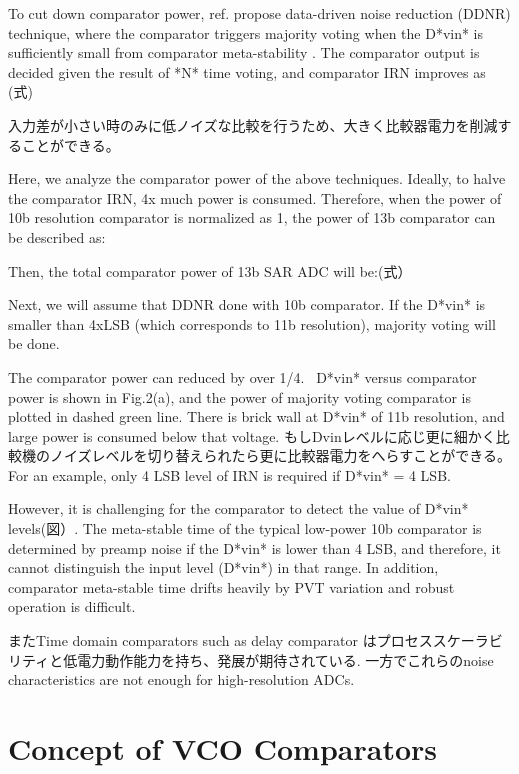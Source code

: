 \documentclass[letterpaper, 10 pt, conference]{ieeeconf}  %
\begin{document}
To cut down comparator power, ref.\cite{harpe201310b} propose data-driven noise reduction (DDNR) technique, where the comparator triggers majority voting when the D*vin* is sufficiently small from comparator meta-stability \cite{shikata20120}. The comparator output is decided given the result of *N* time voting, and comparator IRN improves as (式)

入力差が小さい時のみに低ノイズな比較を行うため、大きく比較器電力を削減することができる。

Here, we analyze the comparator power of the above techniques. Ideally, to halve the comparator IRN, 4x much power is consumed. Therefore, when the power of 10b resolution comparator is normalized as 1, the power of 13b comparator can be described as:

Then, the total comparator power of 13b SAR ADC will be:(式）

Next, we will assume that DDNR done with 10b comparator. If the D*vin* is smaller than 4xLSB (which corresponds to 11b resolution), majority voting will be done.

The comparator power can reduced by over 1/4.  D*vin* versus comparator power is shown in Fig.2(a), and the power of majority voting comparator is plotted in dashed green line. There is brick wall at D*vin* of 11b resolution, and large power is consumed below that voltage. もしDvinレベルに応じ更に細かく比較機のノイズレベルを切り替えられたら更に比較器電力をへらすことができる。For an example, only 4 LSB level of IRN is required if D*vin* = 4 LSB. 

However, it is challenging for the comparator to detect the value of D*vin* levels(図）. The meta-stable time of the typical low-power 10b comparator is determined by preamp noise if the D*vin* is lower than 4 LSB, and therefore, it cannot distinguish the input level (D*vin*) in that range. In addition, comparator meta-stable time drifts heavily by PVT variation and robust operation is difficult.

またTime domain comparators such as delay comparator \cite{agnes20089} はプロセススケーラビリティと低電力動作能力を持ち、発展が期待されている. 一方でこれらのnoise characteristics are not enough for high-resolution ADCs.

\section{Concept of VCO Comparators}
\end{document}
